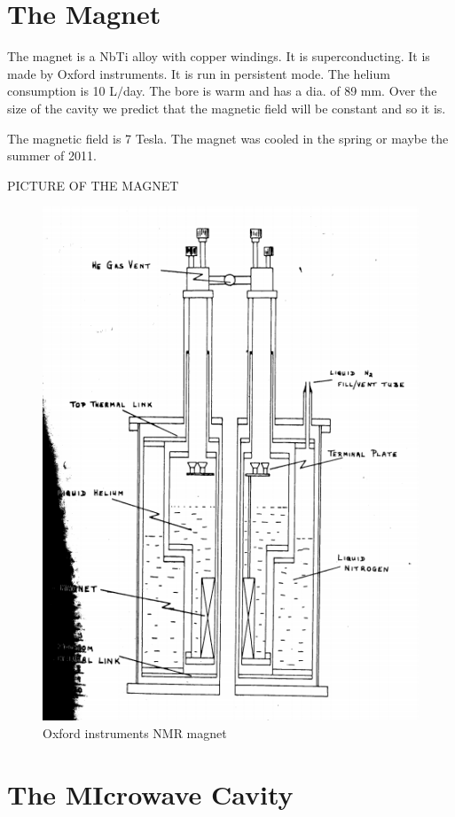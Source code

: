 \documentclass[11pt]{article}
\begin{document}
\section{The Magnet}

The magnet is a NbTi alloy with copper windings. It is superconducting. It is made by Oxford instruments. It is run in persistent mode. The helium consumption is 10 L$/$day. The bore is warm and has a dia. of 89 mm.
Over the size of the cavity we predict that the magnetic field will be constant and so it is.

The magnetic field is 7 Tesla. The magnet was cooled in the spring or maybe the summer of 2011. 

PICTURE OF THE MAGNET
\begin{figure}
\includegraphics[width=\textwidth]{nmrmagnet}
\caption{Oxford instruments NMR magnet}
\end{figure}
\section{The MIcrowave Cavity}
\end{document}
